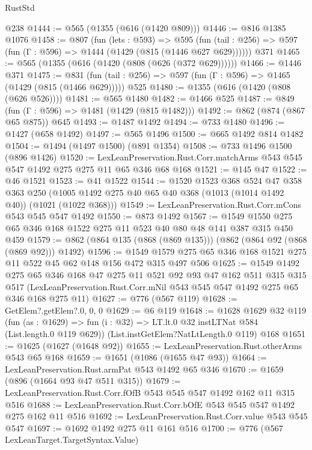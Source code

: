 \begin{lexlean}{RustStd}
\begin{coremodule}
    @238
@1444 := @565 (@1355 (@616 (@1420 @809)))
@1446 := @816 @1385 @1076
@1458 := @807
    (fun (lets : @593) =>
    @595 (fun (tail : @256) => @597 (fun (Γ : @596) => @1444 (@1429 (@815 (@1446 @627 @629))))))
    @371
@1465 := @565 (@1355 (@616 (@1420 (@808 (@626 (@372 @629))))))
@1466 := @1446 @371
@1475 := @831 (fun (tail : @256) => @597 (fun (Γ : @596) => @1465 (@1429 (@815 (@1466 @629))))) @525
@1480 := @1355 (@616 (@1420 (@808 (@626 @526))))
@1481 := @565 @1480
@1482 := @1466 @525
@1487 := @849 (fun (Γ : @596) => @1481 (@1429 (@815 @1482)))
@1492 := @862 (@874 (@867 @65 @875)) @645
@1493 := @1487 @1492
@1494 := @733 @1480
@1496 := @1427 (@658 @1492)
@1497 := @565 @1496
@1500 := @665 @1492 @814 @1482
@1504 := @1494 (@1497 @1500) (@891 @1354)
@1508 := @733 @1496 @1500 (@896 @1426)
@1520 := LexLeanPreservation.Rust.Corr.matchArms
    @543
    @545
    @547
    @1492
    @275
    @275
    @11
    @65
    @346
    @68
    @168
@1521 := @145 @47
@1522 := @46 @1521
@1523 := @41 @1522
@1544 := @1520
    @1523
    @368
    @524
    @47
    @358
    @363
    @250
    (@1005 @1492 @275 @40 @65 @40 @368 (@1013 (@1014 @1492 @40)) (@1021 (@1022 @368)))
@1549 := LexLeanPreservation.Rust.Corr.mCons @543 @545 @547 @1492
@1550 := @873 @1492
@1567 := @1549 @1550 @275 @65 @346 @168 @1522 @275 @11 @523 @40 @80 @48 @141 @387 @315 @450 @459
@1579 := @862 (@864 @135 (@868 (@869 @135))) (@862 (@864 @92 (@868 (@869 @92))) @1492)
@1596 := @1549 @1579 @275 @65 @346 @168 @1521 @275 @11 @522 @45 @62 @148 @156 @472 @315 @497 @506
@1625 := @1549
    @1492
    @275
    @65
    @346
    @168
    @47
    @275
    @11
    @521
    @92
    @93
    @47
    @162
    @511
    @315
    @315
    @517
    (LexLeanPreservation.Rust.Corr.mNil @543 @545 @547 @1492 @275 @65 @346 @168 @275 @11)
@1627 := @776 (@567 @119)
@1628 := GetElem?.getElem?.{0, 0, 0}
@1629 := @6 @119
@1648 := @1628
    @1629
    @32
    @119
    (fun (as : @1629) => fun (i : @32) => LT.lt.{0} @32 instLTNat @584 (List.length.{0} @119 @629))
    (List.instGetElem?NatLtLength.{0} @119)
    @168
@1651 := @1625 (@1627 (@1648 @92))
@1655 := LexLeanPreservation.Rust.otherArms @543 @65 @168
@1659 := @1651 (@1086 (@1655 @47 @93))
@1664 := LexLeanPreservation.Rust.armPat @543 @1492 @65 @346
@1670 := @1659 (@896 (@1664 @93 @47 @511 @315))
@1679 := LexLeanPreservation.Rust.Corr.fOfB @543 @545 @547 @1492 @162 @11 @315 @516
@1688 := LexLeanPreservation.Rust.Corr.bOfE @543 @545 @547 @1492 @275 @162 @11 @516
@1692 := LexLeanPreservation.Rust.Corr.value @543 @545 @547
@1697 := @1692 @1492 @275 @11 @161 @516
@1700 := @776 (@567 LexLeanTarget.TargetSyntax.Value)

\end{coremodule}
\end{lexlean}

